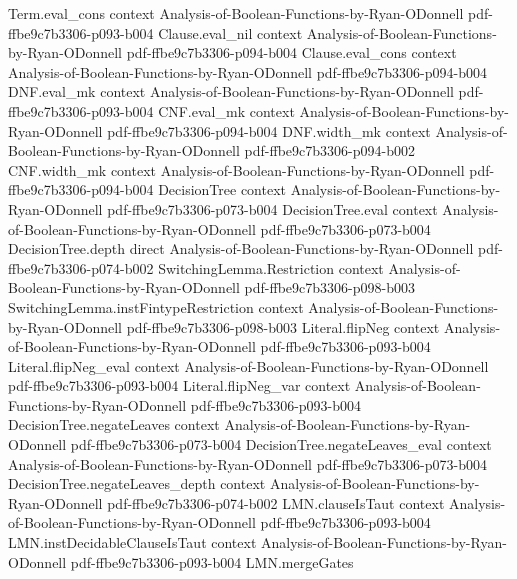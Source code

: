 \begin{lemma}
\proofstep
  {Term.eval_cons}
  {context}
  {Analysis-of-Boolean-Functions-by-Ryan-ODonnell}
  {pdf-ffbe9c7b3306-p093-b004}
\proofstep
  {Clause.eval_nil}
  {context}
  {Analysis-of-Boolean-Functions-by-Ryan-ODonnell}
  {pdf-ffbe9c7b3306-p094-b004}
\proofstep
  {Clause.eval_cons}
  {context}
  {Analysis-of-Boolean-Functions-by-Ryan-ODonnell}
  {pdf-ffbe9c7b3306-p094-b004}
\proofstep
  {DNF.eval_mk}
  {context}
  {Analysis-of-Boolean-Functions-by-Ryan-ODonnell}
  {pdf-ffbe9c7b3306-p093-b004}
\proofstep
  {CNF.eval_mk}
  {context}
  {Analysis-of-Boolean-Functions-by-Ryan-ODonnell}
  {pdf-ffbe9c7b3306-p094-b004}
\proofstep
  {DNF.width_mk}
  {context}
  {Analysis-of-Boolean-Functions-by-Ryan-ODonnell}
  {pdf-ffbe9c7b3306-p094-b002}
\proofstep
  {CNF.width_mk}
  {context}
  {Analysis-of-Boolean-Functions-by-Ryan-ODonnell}
  {pdf-ffbe9c7b3306-p094-b004}
\proofstep
  {DecisionTree}
  {context}
  {Analysis-of-Boolean-Functions-by-Ryan-ODonnell}
  {pdf-ffbe9c7b3306-p073-b004}
\proofstep
  {DecisionTree.eval}
  {context}
  {Analysis-of-Boolean-Functions-by-Ryan-ODonnell}
  {pdf-ffbe9c7b3306-p073-b004}
\proofstep
  {DecisionTree.depth}
  {direct}
  {Analysis-of-Boolean-Functions-by-Ryan-ODonnell}
  {pdf-ffbe9c7b3306-p074-b002}
\proofstep
  {SwitchingLemma.Restriction}
  {context}
  {Analysis-of-Boolean-Functions-by-Ryan-ODonnell}
  {pdf-ffbe9c7b3306-p098-b003}
\proofstep
  {SwitchingLemma.instFintypeRestriction}
  {context}
  {Analysis-of-Boolean-Functions-by-Ryan-ODonnell}
  {pdf-ffbe9c7b3306-p098-b003}
\proofstep
  {Literal.flipNeg}
  {context}
  {Analysis-of-Boolean-Functions-by-Ryan-ODonnell}
  {pdf-ffbe9c7b3306-p093-b004}
\proofstep
  {Literal.flipNeg_eval}
  {context}
  {Analysis-of-Boolean-Functions-by-Ryan-ODonnell}
  {pdf-ffbe9c7b3306-p093-b004}
\proofstep
  {Literal.flipNeg_var}
  {context}
  {Analysis-of-Boolean-Functions-by-Ryan-ODonnell}
  {pdf-ffbe9c7b3306-p093-b004}
\proofstep
  {DecisionTree.negateLeaves}
  {context}
  {Analysis-of-Boolean-Functions-by-Ryan-ODonnell}
  {pdf-ffbe9c7b3306-p073-b004}
\proofstep
  {DecisionTree.negateLeaves_eval}
  {context}
  {Analysis-of-Boolean-Functions-by-Ryan-ODonnell}
  {pdf-ffbe9c7b3306-p073-b004}
\proofstep
  {DecisionTree.negateLeaves_depth}
  {context}
  {Analysis-of-Boolean-Functions-by-Ryan-ODonnell}
  {pdf-ffbe9c7b3306-p074-b002}
\proofstep
  {LMN.clauseIsTaut}
  {context}
  {Analysis-of-Boolean-Functions-by-Ryan-ODonnell}
  {pdf-ffbe9c7b3306-p093-b004}
\proofstep
  {LMN.instDecidableClauseIsTaut}
  {context}
  {Analysis-of-Boolean-Functions-by-Ryan-ODonnell}
  {pdf-ffbe9c7b3306-p093-b004}
\proofstep
  {LMN.mergeGates}

\end{lemma}
